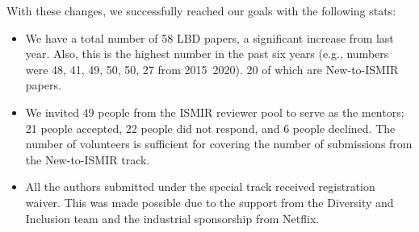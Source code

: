 \documentclass[%
10pt,								%
]
{scrartcl}
\begin{document}
        
            With these changes, we successfully reached our goals with the following stats: 
            \begin{itemize}
                \item   We have a total number of 58 LBD papers, a significant increase from last year. Also, this is the highest number in the past six years (e.g., numbers were 48, 41, 49, 50, 50, 27 from 2015~2020). 20 of which are New-to-ISMIR papers.
                \item   We invited 49 people from the ISMIR reviewer pool to serve as the mentors; 21 people accepted, 22 people did not respond, and 6 people declined. The number of volunteers is sufficient for covering the number of submissions from the New-to-ISMIR track.

                \item   All the authors submitted under the special track received registration waiver. This was made possible due to the support from the Diversity and Inclusion team and the industrial sponsorship from Netflix. 
            \end{itemize}
\end{document}
